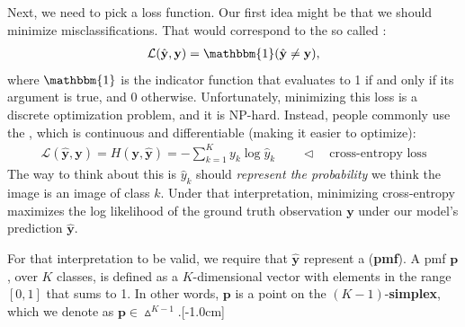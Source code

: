 Next, we need to pick a loss function. Our first idea might be that we should minimize misclassifications. That would correspond to the so called :
\begin{align}
    \mathcal{L}(\hat{\mathbf{y}},\mathbf{y}) = \mathbbm{1}(\hat{\mathbf{y}}\neq\mathbf{y}),
\end{align}
where $\mathbbm{1}$ is the indicator function that evaluates to 1 if and only if its argument is true, and 0 otherwise. Unfortunately, minimizing this loss is a discrete optimization problem, and it is NP-hard. Instead, people commonly use the , which is continuous and differentiable (making it easier to optimize):
\begin{align}
    \mathcal{L}(\hat{\mathbf{y}},\mathbf{y}) = H(\mathbf{y}, \hat{\mathbf{y}}) = - \sum_{k=1}^K y_k \log \hat{y}_k \quad\quad \triangleleft \quad \text{cross-entropy loss}
\end{align}
The way to think about this is $\hat{y}_k$ should \textit{represent the probability} we think the image is an image of class $k$. Under that interpretation, minimizing cross-entropy maximizes the log likelihood of the ground truth observation $\mathbf{y}$ under our model's prediction $\hat{\mathbf{y}}$.

For that interpretation to be valid, we require that $\hat{\mathbf{y}}$ represent a  ({\bf pmf}). A pmf $\mathbf{p}$, over $K$ classes, is defined as a $K$-dimensional vector with elements in the range $[0,1]$ that sums to 1. In other words, $\mathbf{p}$ is a point on the $(K-1)$-\textbf{simplex}, which we denote as $\mathbf{p} \in \vartriangle^{K-1}$.[-1.0cm]

